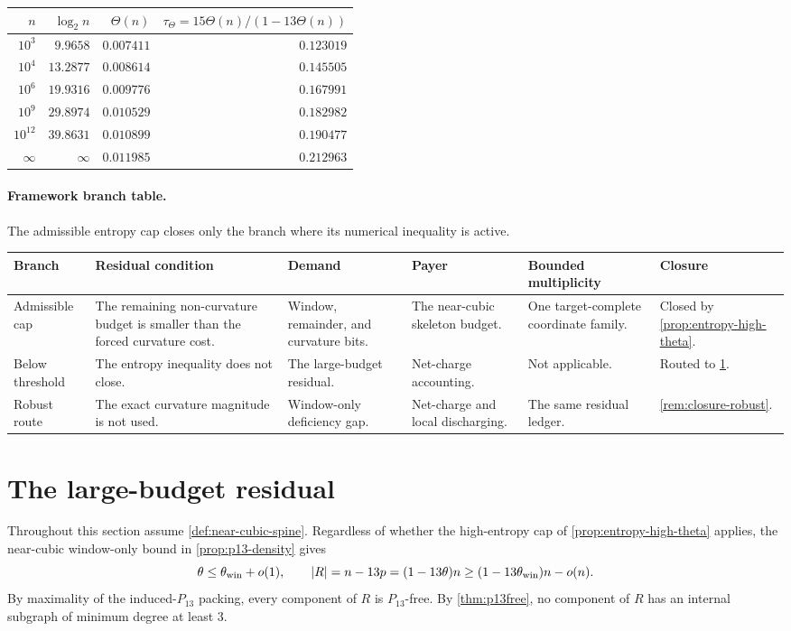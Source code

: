 \documentclass[11pt]{article}
\newcommand{\FrameworkBranchTableHeader}{%
\toprule
\textbf{Branch} & \textbf{Residual condition} & \textbf{Demand} & \textbf{Payer} & \textbf{Bounded multiplicity} & \textbf{Closure}\\
\midrule
}
\begin{document}
\begin{center}
\begin{tabular}{rrrr}
\toprule
$n$ & $\log_2 n$ & $\Theta(n)$ & $\tau_{\Theta}=15\Theta(n)/(1-13\Theta(n))$\\
\midrule
$10^3$ & $9.9658$ & $0.007411$ & $0.123019$\\
$10^4$ & $13.2877$ & $0.008614$ & $0.145505$\\
$10^6$ & $19.9316$ & $0.009776$ & $0.167991$\\
$10^9$ & $29.8974$ & $0.010529$ & $0.182982$\\
$10^{12}$ & $39.8631$ & $0.010899$ & $0.190477$\\
$\infty$ & $\infty$ & $0.011985$ & $0.212963$\\
\bottomrule
\end{tabular}
\end{center}

\paragraph{Framework branch table.}
The admissible entropy cap closes only the branch where its numerical
inequality is active.
\begin{longtable}{L{0.13\textwidth} L{0.19\textwidth} L{0.14\textwidth} L{0.14\textwidth} L{0.17\textwidth} L{0.17\textwidth}}
\FrameworkBranchTableHeader
Admissible cap
&
The remaining non-curvature budget is smaller than the forced curvature cost.
&
Window, remainder, and curvature bits.
&
The near-cubic skeleton budget.
&
One target-complete coordinate family.
&
Closed by \cref{prop:entropy-high-theta}.
\\
\addlinespace
Below threshold
&
The entropy inequality does not close.
&
The large-budget residual.
&
Net-charge accounting.
&
Not applicable.
&
Routed to \cref{sec:large-budget}.
\\
\addlinespace
Robust route
&
The exact curvature magnitude is not used.
&
Window-only deficiency gap.
&
Net-charge and local discharging.
&
The same residual ledger.
&
\cref{rem:closure-robust}.
\\
\bottomrule
\end{longtable}

\section{The large-budget residual}\label{sec:large-budget}

Throughout this section assume \cref{def:near-cubic-spine}.
Regardless of whether the high-entropy cap of
\cref{prop:entropy-high-theta} applies, the near-cubic window-only bound in
\cref{prop:p13-density} gives
\[
\theta\le\theta_{\rm win}+o(1),
\qquad
|R|=n-13p=(1-13\theta)n\ge(1-13\theta_{\rm win})n-o(n).
\]
By maximality of the induced-$P_{13}$ packing, every component of $R$ is $P_{13}$-free.  By \cref{thm:p13free}, no component of $R$ has an internal subgraph of minimum degree at least $3$.
\end{document}

